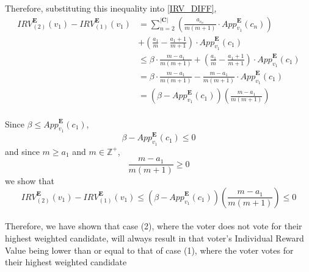 \documentclass{article}
\begin{document}
Therefore, substituting this inequality into \eqref{IRV_DIFF},
\begin{equation}
\begin{aligned}
{IRV}^{\pmb{E}}_{(2)}(v_1) - {IRV}^{\pmb{E}}_{(1)}(v_1)
&=  \sum^{|\pmb{C}|}_{n = 2}{\left(\frac{a_{c_{n}}}{m(m+1)}\cdot{App}^{\pmb{E}}_{v_1}(c_{n})\right)}\\
&+ \left(\frac{a_1}{m}-\frac{a_{1}+1}{m+1}\right)\cdot{App}^{\pmb{E}}_{v_1}(c_1)\\
&\leq \beta\cdot\frac{m-a_1}{m(m+1)} + \left(\frac{a_1}{m}-\frac{a_{1}+1}{m+1}\right)\cdot{App}^{\pmb{E}}_{v_1}(c_1)\\
&= \beta\cdot\frac{m-a_1}{m(m+1)} - \frac{m-a_1}{m(m+1)}\cdot{App}^{\pmb{E}}_{v_1}(c_1)\\
&= \left(\beta - {App}^{\pmb{E}}_{v_1}(c_1)\right)\left(\frac{m-a_1}{m(m+1)}\right)
\end{aligned} 
\end{equation}\\

Since $\beta \leq {App}^{\pmb{E}}_{v_1}(c_1)$,
\begin{equation}
     \beta - {App}^{\pmb{E}}_{v_1}(c_1) \leq 0
\end{equation}
and since $m \geq a_1$ and $m \in \mathbb{Z}^+$,
\begin{equation}
     \frac{m-a_1}{m(m+1)} \geq 0
\end{equation}
we show that 
\begin{equation}
     {IRV}^{\pmb{E}}_{(2)}(v_1) - {IRV}^{\pmb{E}}_{(1)}(v_1) \leq \left(\beta - {App}^{\pmb{E}}_{v_1}(c_1)\right)\left(\frac{m-a_1}{m(m+1)}\right) \leq 0
\end{equation}\\

Therefore, we have shown that case (2), where the voter does not vote for their highest weighted candidate, will always result in that voter's Individual Reward Value being lower than or equal to that of case (1), where the voter votes for their highest weighted candidate
\end{document}
